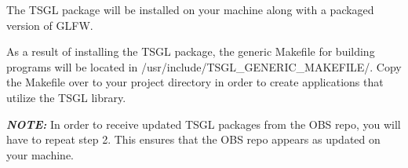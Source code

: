 The T\+S\+GL package will be installed on your machine along with a packaged version of G\+L\+FW.

As a result of installing the T\+S\+GL package, the generic Makefile for building programs will be located in {\ttfamily /usr/include/\+T\+S\+G\+L\+\_\+\+G\+E\+N\+E\+R\+I\+C\+\_\+\+M\+A\+K\+E\+F\+I\+L\+E/}. Copy the Makefile over to your project directory in order to create applications that utilize the T\+S\+GL library.

{\itshape {\bfseries{N\+O\+TE\+:}}} In order to receive updated T\+S\+GL packages from the O\+BS repo, you will have to repeat step 2. This ensures that the O\+BS repo appears as updated on your machine. 